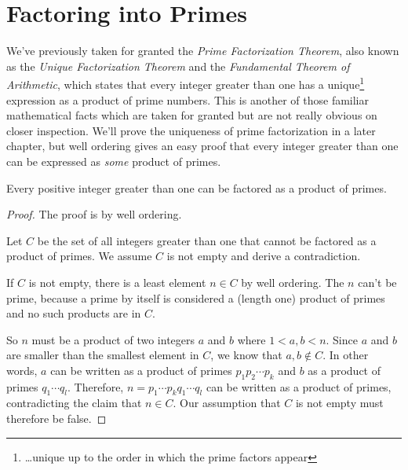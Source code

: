 \begin{problems}
\practiceproblems
{}

\classproblems
{}

\homeworkproblems
{}

\examproblems
{}
\end{problems}

\section{Factoring into Primes}\label{factor_sec}

We've previously taken for granted the \emph{Prime Factorization
  Theorem},%
% 
 also known as the \emph{Unique Factorization Theorem} and the
    \emph{Fundamental Theorem of Arithmetic}, which states that every
    integer greater than one has a unique\footnote{\dots unique up to
      the order in which the prime factors appear} expression as a
    product of prime numbers.  This is another of those familiar
    mathematical facts which are taken for granted but are not really
    obvious on closer inspection.  We'll prove the uniqueness of prime
    factorization in a later chapter, but well ordering gives an easy
    proof that every integer greater than one can be expressed as
    \emph{some} product of primes.

\begin{theorem}\label{factor_into_primes}
Every positive integer greater than one can be factored as a product of primes.
\end{theorem}
\begin{proof}
The proof is by well ordering.

Let $C$ be the set of all integers greater than one that cannot be
factored as a product of primes.  We assume $C$ is not empty and derive a
contradiction.

If $C$ is not empty, there is a least element $n \in C$ by well
ordering.  The $n$ can't be prime, because a prime by itself is considered
a (length one) product of primes and no such products are in $C$.

So $n$ must be a product of two integers $a$ and $b$ where $1<a,b<n$.
Since $a$ and $b$ are smaller than the smallest element in $C$, we know
that $a,b \notin C$.  In other words, $a$ can be written as a product of
primes $p_1p_2\cdots p_k$ and $b$ as a product of primes $q_1\cdots q_l$.
Therefore, $n=p_1\cdots p_k q_1 \cdots q_l$ can be written as a product of
primes, contradicting the claim that $n \in C$.  Our assumption that $C$
is not empty must therefore be false.
\end{proof}

